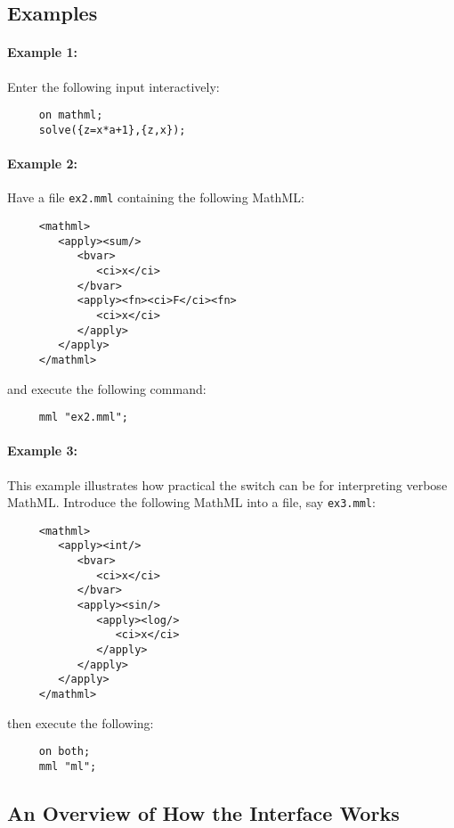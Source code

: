 \subsection{Examples}

\paragraph{Example 1:} Enter the following input interactively:

\begin{verbatim}
     on mathml;
     solve({z=x*a+1},{z,x});
\end{verbatim}

\paragraph{Example 2:}
Have a file \texttt{ex2.mml} containing the following MathML:
\begin{verbatim}
     <mathml>
        <apply><sum/>
           <bvar>
              <ci>x</ci>
           </bvar>
           <apply><fn><ci>F</ci><fn>
              <ci>x</ci>
           </apply>
        </apply>
     </mathml>
\end{verbatim}
and execute the following command:
\begin{verbatim}
     mml "ex2.mml";
\end{verbatim}

\paragraph{Example 3:}
This example illustrates how practical the switch  can be for
interpreting verbose MathML.  Introduce the following MathML into a
file, say \texttt{ex3.mml}:
\begin{verbatim}
     <mathml>
        <apply><int/>
           <bvar>
              <ci>x</ci>
           </bvar>
           <apply><sin/>
              <apply><log/>
                 <ci>x</ci>
              </apply>
           </apply>
        </apply>
     </mathml>
\end{verbatim}
then execute the following:
\begin{verbatim}
     on both;
     mml "ml";
\end{verbatim}

\subsection{An Overview of How the Interface Works}

